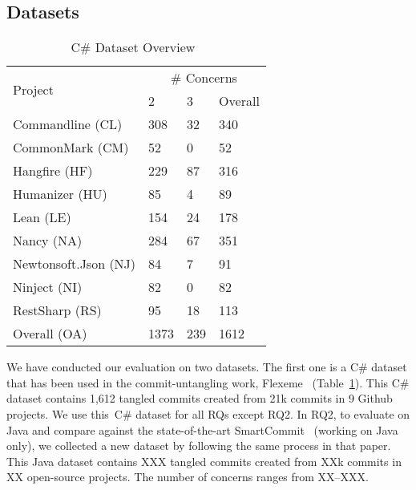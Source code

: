 \subsection{Datasets}

\begin{table}[t]
	\caption{C\# Dataset Overview~\cite{flexeme-fse20}}
	\vspace{-0.1in}
	\begin{center}
		\footnotesize
		\tabcolsep 4pt
		\renewcommand{\arraystretch}{1} \begin{tabular}{p{3cm}<{\centering}|p{0.8cm}<{\centering}p{0.8cm}<{\centering}p{0.8cm}<{\centering}}
			
			\hline
			\multirow{2}{*}{Project}                  & \multicolumn{3}{c}{\# Concerns}\\
			\cline{2-4}
			                     & 2 & 3& Overall\\
			\hline
			
			Commandline (CL)        &  308 & 32  &   340        \\
			CommonMark (CM)        &  52 & 0  &   52        \\
			Hangfire (HF)       &  229 & 87  &   316        \\
			Humanizer (HU)        &  85 & 4  &   89        \\
			Lean (LE)        &  154 & 24  &   178        \\
			Nancy (NA)       &  284 & 67  &   351        \\
			Newtonsoft.Json (NJ)        &  84 & 7  &   91        \\
			Ninject (NI)       &  82 & 0  &  82        \\
			RestSharp (RS)       &  95 & 18  &   113        \\
			\hline
			Overall (OA)       &  1373 & 239  &  1612        \\
			\hline
		\end{tabular}
		\label{C-dataset}
	\end{center}
\end{table}

We have conducted our evaluation on two datasets. The first one is a
C\# dataset that has been used in the commit-untangling work,
Flexeme~\cite{flexeme-fse20} (Table~\ref{C-dataset}). This C\# dataset
contains 1,612 tangled commits created from 21k commits in 9 Github
projects. We use this~C\# dataset for all RQs except RQ2. In RQ2, to
evaluate {\tool} on Java and compare against the
state-of-the-art SmartCommit~\cite{smartcommit-fse21} (working on Java
only), we collected a new dataset by following the same process in
that paper. This Java dataset contains XXX tangled commits created
from XXk commits in XX open-source projects. The number of concerns
ranges from XX--XXX.

